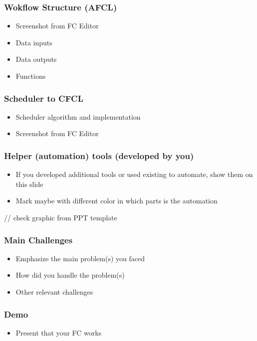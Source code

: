 \documentclass[11pt,t,usepdftitle=false,aspectratio=169]{beamer}
\begin{document}
\begin{frame}
\frametitle{Wokflow Structure (AFCL)}
    \begin{itemize}
        \item Screenshot from FC Editor
        \item Data inputs
        \item Data outputs
        \item Functions
    \end{itemize}
\end{frame}

\begin{frame}
\frametitle{Scheduler to CFCL}
    \begin{itemize}
        \item Scheduler algorithm and implementation
        \item Screenshot from FC Editor
    \end{itemize}
\end{frame}

\begin{frame}
\frametitle{Helper (automation) tools (developed by you)}
    \begin{itemize}
        \item If you developed additional tools or used existing to automate, show them on this slide
        \item Mark maybe with different color in which parts is the automation
    \end{itemize}
    \vspace{1cm}
    // check graphic from PPT template
\end{frame}

\begin{frame}
\frametitle{Main Challenges}
    \begin{itemize}
        \item Emphasize the main problem(s) you faced
        \item How did you handle the problem(s)
        \item Other relevant challenges
    \end{itemize}
\end{frame}

\begin{frame}
\frametitle{Demo}
    \begin{itemize}
        \item Present that your FC works
    \end{itemize}
\end{frame}
\end{document}
